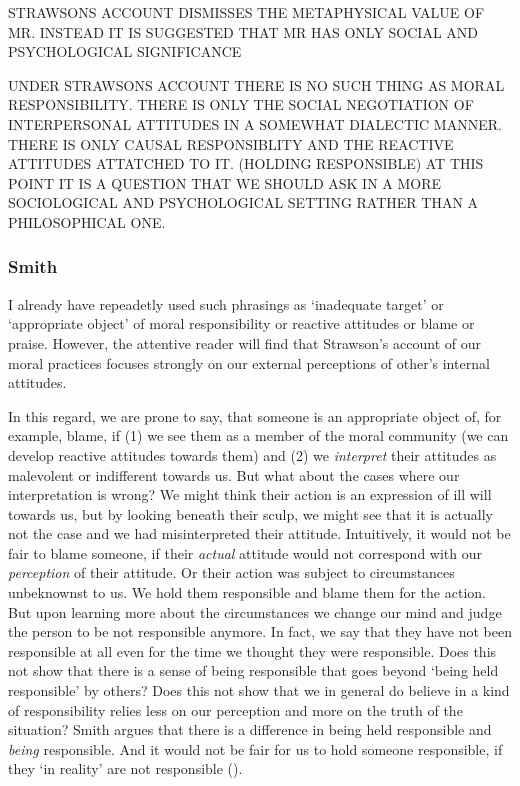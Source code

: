 \documentclass{article}
\newcounter{example}
\begin{document}
STRAWSONS ACCOUNT DISMISSES THE METAPHYSICAL VALUE OF MR. INSTEAD IT IS
SUGGESTED THAT MR HAS ONLY SOCIAL AND PSYCHOLOGICAL SIGNIFICANCE

UNDER STRAWSONS ACCOUNT THERE IS NO SUCH THING AS MORAL RESPONSIBILITY. THERE IS
ONLY THE SOCIAL NEGOTIATION OF INTERPERSONAL ATTITUDES IN A SOMEWHAT DIALECTIC
MANNER. THERE IS ONLY CAUSAL RESPONSIBLITY AND THE REACTIVE ATTITUDES ATTATCHED
TO IT. (HOLDING RESPONSIBLE)
AT THIS POINT IT IS A QUESTION THAT WE SHOULD ASK IN A MORE SOCIOLOGICAL AND
PSYCHOLOGICAL SETTING RATHER THAN A PHILOSOPHICAL ONE.

\subsubsection{Smith}

 I already have repeadetly used such phrasings as `inadequate target' or
 `appropriate object' of moral responsibility or reactive attitudes or blame or
 praise. However, the attentive reader will find that Strawson's account of our
 moral practices focuses strongly on our external perceptions of other's
 internal attitudes.

 In this regard, we are prone to say, that someone is an
 appropriate object of, for example, blame, if (1) we see them as a member of the moral
 community (we can develop reactive attitudes towards them) and (2) we
 \textit{interpret} their attitudes as malevolent or indifferent towards us. But what
 about the cases where our interpretation is wrong? We might think their action
 is an expression of ill will towards us, but by looking beneath their sculp, we
 might see that it is actually not the case and we had misinterpreted their
 attitude. Intuitively, it would not be fair to blame someone, if their
 \textit{actual}
 attitude would not correspond with our \textit{perception} of their attitude.
 Or their action was subject to circumstances unbeknownst to us. We hold them
 responsible and blame them for the action. But upon learning more about the
 circumstances we change our mind and judge the person to be not responsible
 anymore. In fact, we say that they have not been responsible at all even for the
 time we thought they were responsible. Does this not show that there is a sense
 of being responsible that goes beyond `being held responsible' by others? Does
 this not show that we in general do believe in a kind of responsibility relies
 less on our perception and more on the truth of the situation? 
 Smith argues that there is a difference in being held responsible and 
 \textit{being} responsible. And it would not be fair for us to hold someone
 responsible, if they `in reality' are not responsible (\cite[p.
 472]{Smith_2007}).\\
\end{document}
